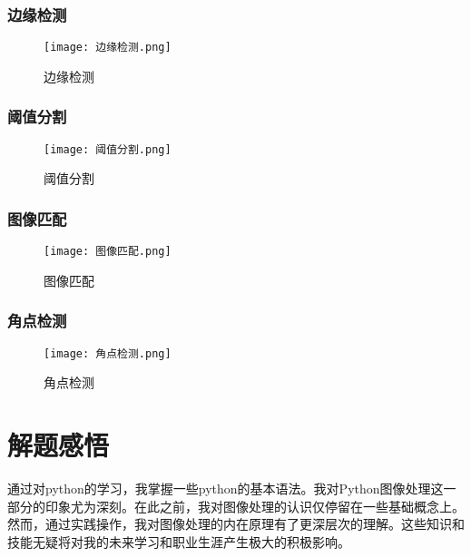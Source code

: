 \documentclass{ctexart}
\begin{document}
\subsubsection{边缘检测}
\begin{figure}[H]
    \centering
    \texttt{[image: 边缘检测.png]}
    \caption{边缘检测}
    \label{fig:enter-label}
\end{figure}
\subsubsection{阈值分割}

\begin{figure}[H]
    \centering
    \texttt{[image: 阈值分割.png]}
    \caption{阈值分割}
    \label{fig:enter-label}
\end{figure}

\subsubsection{图像匹配}
\begin{figure}[H]
    \centering
    \texttt{[image: 图像匹配.png]}
    \caption{图像匹配}
    \label{fig:enter-label}
\end{figure}

\subsubsection{角点检测}
\begin{figure}
    \centering
    \texttt{[image: 角点检测.png]}
    \caption{角点检测}
    \label{fig:enter-label}
\end{figure}




\section{解题感悟}
通过对python的学习，我掌握一些python的基本语法。我对Python图像处理这一部分的印象尤为深刻。在此之前，我对图像处理的认识仅停留在一些基础概念上。然而，通过实践操作，我对图像处理的内在原理有了更深层次的理解。这些知识和技能无疑将对我的未来学习和职业生涯产生极大的积极影响。
\end{document}
